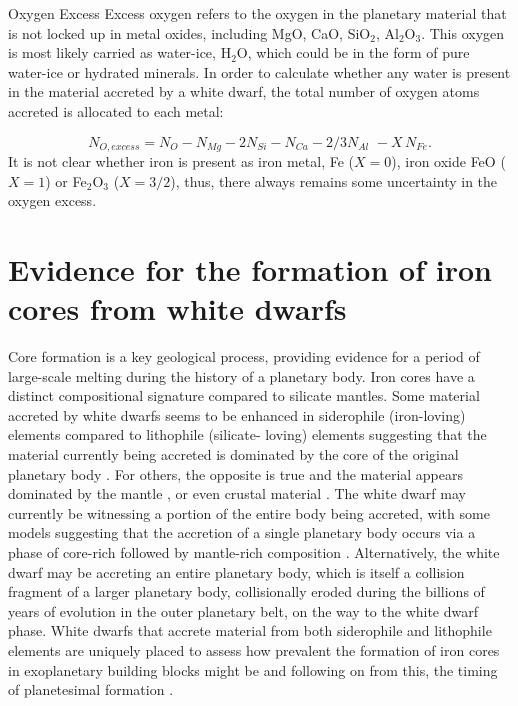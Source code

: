 \documentclass[onecolumn,authoryear]{els-mrw}
\begin{document}
\begin{BoxTypeA}{Oxygen Excess}
\indent Excess oxygen refers to the oxygen in the planetary material that is not locked up in metal oxides, including MgO, CaO, SiO$_2$, Al$_2$O$_3$. This oxygen is most likely carried as water-ice, H$_2$O, which could be in the form of pure water-ice or hydrated minerals. In order to calculate whether any water is present in the material accreted by a white dwarf, the total number of oxygen atoms accreted is allocated to each metal:

\begin{equation}
    N_{O, excess} = N_O- N_{Mg}- 2N_{Si} -N_{Ca} - 2/3 N_{Al}\, \,  - X\, N_{Fe}. 
\end{equation}
It is not clear whether iron is present as iron metal, Fe ($X=0$), iron oxide FeO ($X=1$) or Fe$_2$O$_3$ ($X=3/2$), thus, there always remains some uncertainty in the oxygen excess. 
\end{BoxTypeA}

\section{Evidence for the formation of iron cores from white dwarfs}
Core formation is a key geological process, providing evidence for a period of large-scale melting during the history of a planetary body. Iron cores have a distinct compositional signature compared to silicate mantles. Some material accreted by white dwarfs seems to be enhanced in siderophile (iron-loving) elements compared to lithophile (silicate- loving) elements suggesting that the material currently being accreted is dominated by the core of the original planetary body \citep{Melis2011, Hollands2018}. For others, the opposite is true and the material appears dominated by the mantle \citep{Swan2019, Buchan2022}, or even crustal material \citep{Zuckerman2011}. 
The white dwarf may currently be witnessing a portion of the entire body being accreted, with some models suggesting that the accretion of a single planetary body occurs via a phase of core-rich followed by mantle-rich composition \citep{Brouwers2023_async}. Alternatively, the white dwarf may be accreting an entire planetary body, which is itself a collision fragment of a larger planetary body, collisionally eroded during the billions of years of evolution in the outer planetary belt, on the way to the white dwarf phase. White dwarfs that accrete material from both siderophile and lithophile elements are uniquely placed to assess how prevalent the formation of iron cores in exoplanetary building blocks might be \citep{bonsor2020} and following on from this, the timing of planetesimal formation \citep{Bonsor_al26}.  
\end{document}
